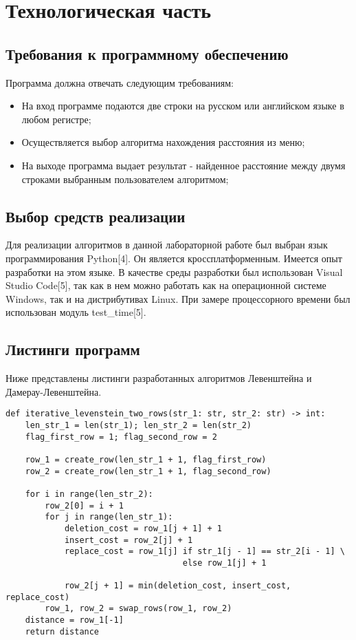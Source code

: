 \chapter{Технологическая часть}
\section{Требования к программному обеспечению}
Программа должна отвечать следующим требованиям:
\begin{itemize}
	\item На вход программе подаются две строки на русском или английском языке в любом регистре;
	\item Осуществляется выбор алгоритма нахождения расстояния из меню;
	\item На выходе программа выдает результат - найденное расстояние между двумя строками выбранным пользователем алгоритмом;
\end{itemize}

\section{Выбор средств реализации}
Для реализации алгоритмов в данной лабораторной работе был выбран язык программирования Python[4]. Он является кроссплатформенным. Имеется опыт разработки на этом языке. В качестве среды разработки был использован Visual Studio Code[5], так как в нем можно работать как на операционной системе Windows, так и на дистрибутивах Linux. При замере процессорного времени был использован модуль test\_time[5].
\section{Листинги программ}
Ниже представлены листинги разработанных алгоритмов Левенштейна и Дамерау-Левенштейна.

\begin{lstlisting}[label=some-code,caption=Программный код нахождения расстояния Левенштейна итеративно с использованием двух строк]
def iterative_levenstein_two_rows(str_1: str, str_2: str) -> int:
	len_str_1 = len(str_1); len_str_2 = len(str_2)
	flag_first_row = 1; flag_second_row = 2
	
	row_1 = create_row(len_str_1 + 1, flag_first_row)
	row_2 = create_row(len_str_1 + 1, flag_second_row)
	
	for i in range(len_str_2):
		row_2[0] = i + 1
		for j in range(len_str_1):
			deletion_cost = row_1[j + 1] + 1
			insert_cost = row_2[j] + 1
			replace_cost = row_1[j] if str_1[j - 1] == str_2[i - 1] \
									else row_1[j] + 1
	
			row_2[j + 1] = min(deletion_cost, insert_cost, replace_cost)
		row_1, row_2 = swap_rows(row_1, row_2)
	distance = row_1[-1]
	return distance
\end{lstlisting}

